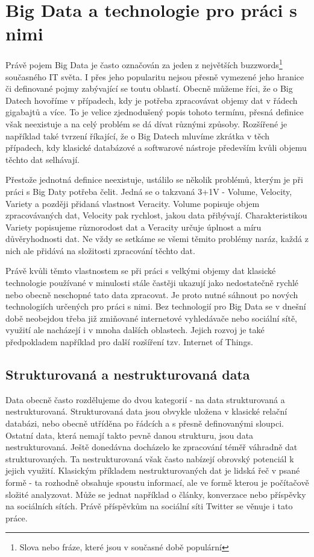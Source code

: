 \documentclass[thesis=B,czech]{FITthesis}[2012/06/26]
\begin{document}
\section{Big Data a technologie pro práci s nimi}
	Právě pojem Big Data je často označován za jeden z největších buzzwords\footnote{Slova nebo fráze, které jsou v současné době populární} současného IT světa. I přes jeho popularitu nejsou přesně vymezené jeho hranice či definované pojmy zabývající se toutu oblastí. Obecně můžeme říci, že o Big Datech hovoříme v případech, kdy je potřeba zpracovávat objemy dat v řádech gigabajtů a více. To je velice zjednodušený popis tohoto termínu, přesná definice však neexistuje a na celý problém se dá dívat různými způsoby. Rozšířené je například také tvrzení říkající, že o Big Datech mluvíme zkrátka v těch případech, kdy klasické databázové a softwarové nástroje především kvůli objemu těchto dat selhávají\cite{webopedia-bigdata}. 

	Přestože jednotná definice neexistuje, ustálilo se několik problémů, kterým je při práci s Big Daty potřeba čelit. Jedná se o takzvaná 3+1V - Volume, Velocity, Variety a později přidaná vlastnost Veracity\cite{dp-customer-inteligence}. Volume popisuje objem zpracovávaných dat, Velocity pak rychlost, jakou data přibývají. Charakteristikou Variety popisujeme různorodost dat a Veracity určuje úplnost a míru důvěryhodnosti dat. Ne vždy se setkáme se všemi těmito problémy naráz, každá z nich ale přidává na složitosti zpracování těchto dat. 
	
	Právě kvůli těmto vlastnostem se při práci s velkými objemy dat klasické technologie používané v minulosti stále častěji ukazují jako nedostatečně rychlé nebo obecně neschopné tato data zpracovat. Je proto nutné sáhnout po nových technologiích určených pro práci s nimi. Bez technologií pro Big Data se v dnešní době neobejdou třeba již zmiňované internetové vyhledávače nebo sociální sítě, využití ale nacházejí i v mnoha dalších oblastech. Jejich rozvoj je také předpokladem například pro další rozšíření tzv. Internet of Things\cite{bigdata-iot}.  

\subsection{Strukturovaná a nestrukturovaná data}	
	Data obecně často rozdělujeme do dvou kategorií - na data strukturovaná a nestrukturovaná. Strukturovaná data jsou obvykle uložena v klasické relační databázi, nebo obecně utříděna po řádcích a s přesně definovanými sloupci. Ostatní data, která nemají takto pevně danou strukturu, jsou data nestrukturovaná. Ještě donedávna docházelo ke zpracování téměř váhradně dat strukturovaných. Ta nestrukturovaná však často nabízejí obrovský potenciál k jejich využití. Klasickým příkladem nestrukturovaných dat je lidská řeč v psané formě - ta rozhodně obsahuje spoustu informací, ale ve formě kterou je počítačově složité analyzovat. Může se jednat například o články, konverzace nebo příspěvky na sociálních sítích.  Právě příspěvkům na sociální síti Twitter se věnuje i tato práce. 
	
\end{document}
